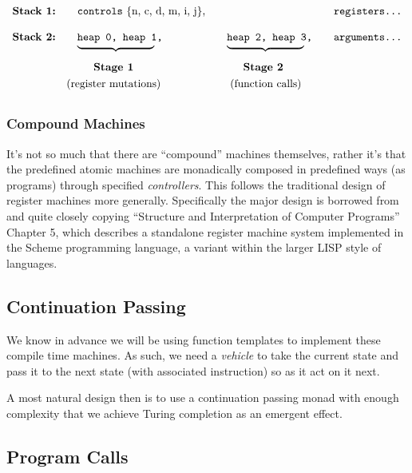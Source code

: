 \documentclass[twoside]{article}
\newcommand{\bfmbox}[1]{\mbox{\bfseries #1}}
\newcommand{\tab}[1][1.125cm]{\hspace{#1}}
\newcommand{\col}[1][0ex]{& \hspace{#1}}
\begin{document}
$$ \def\arraystretch{2}
\tab[0cm] \begin{array}{llll}
\bfmbox{Stack 1:} \col[1em]   \texttt{controls}\mbox{ \{n, c, d, m, i, j\},}             \col\col[1em] \texttt{registers\ldots} \\
\bfmbox{Stack 2:} \col[1em]   \texttt{heap 0, heap 1,}  \col[1em]   \texttt{heap 2, heap 3,} \col[1em] \texttt{arguments\ldots} \\[-2em]
		  \col[1em]   \underbrace{\tab[2.5cm]}  \col[1em]   \underbrace{\tab[2.5cm]}                                    \\
		  \col[2.5em] \bfmbox{Stage 1}          \col[2.5em] \bfmbox{Stage 2}                                            \\[-2ex]
		  \col      \mbox{(register mutations)} \col[3ex] \mbox{(function calls)}
\end{array} $$

\subsubsection*{Compound Machines}

It's not so much that there are ``compound'' machines themselves, rather it's that the predefined atomic machines
are monadically composed in predefined ways (as programs) through specified \emph{controllers}. This follows the
traditional design of register machines more generally. Specifically the major design is borrowed from and quite
closely copying ``Structure and Interpretation of Computer Programs'' Chapter 5, which describes a standalone register
machine system implemented in the Scheme programming language, a variant within the larger LISP style of languages.

\subsection*{Continuation Passing}

We know in advance we will be using function templates to implement these compile time machines.
As such, we need a \emph{vehicle} to take the current state and pass it to the next state
(with associated instruction) so as it act on it next.

A most natural design then is to use a continuation passing monad with enough complexity that we achieve Turing
completion as an emergent effect.

\subsection*{Program Calls}
\end{document}
